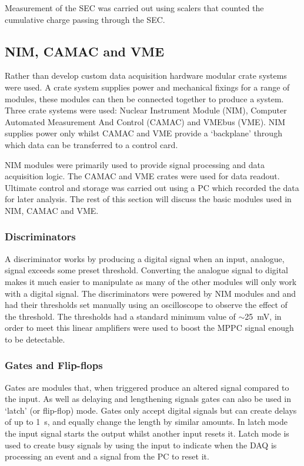 Measurement of the SEC was carried out using scalers that counted the cumulative charge passing through the SEC.


\subsection{NIM, CAMAC and VME} %
\label{sub:nim_and_camac}
Rather than develop custom data acquisition hardware modular crate systems were used. A crate system supplies power and mechanical fixings for a range of modules, these modules can then be connected together to produce a system. Three crate systems were used: Nuclear Instrument Module (NIM), Computer Automated Measurement And Control (CAMAC) and VMEbus (VME). NIM supplies power only whilst CAMAC and VME provide a `backplane' through which data can be transferred to a control card.

NIM modules were primarily used to provide signal processing and data acquisition logic. The CAMAC and VME crates were used for data readout. Ultimate control and storage was carried out using a PC which recorded the data for later analysis. The rest of this section will discuss the basic modules used in NIM, CAMAC and VME.
\subsubsection{Discriminators} %
\label{ssub:discriminators}
A discriminator works by producing a digital signal when an input, analogue, signal exceeds some preset threshold. Converting the analogue signal to digital makes it much easier to manipulate as many of the other modules will only work with a digital signal. The discriminators were powered by NIM modules and and had their thresholds set manually using an oscilloscope to observe the effect of the threshold. The thresholds had a standard minimum value of \(\sim\)25~mV, in order to meet this linear amplifiers were used to boost the MPPC signal enough to be detectable. 

\subsubsection{Gates and Flip-flops} %
\label{ssub:gates}
Gates are modules that, when triggered produce an altered signal compared to the input. As well as delaying and lengthening signals gates can also be used in `latch' (or flip-flop) mode. Gates only accept digital signals but can create delays of up to 1~s, and equally change the length by similar amounts. In latch mode the input signal starts the output whilst another input resets it. Latch mode is used to create busy signals by using the input to indicate when the DAQ is processing an event and a signal from the PC to reset it.

